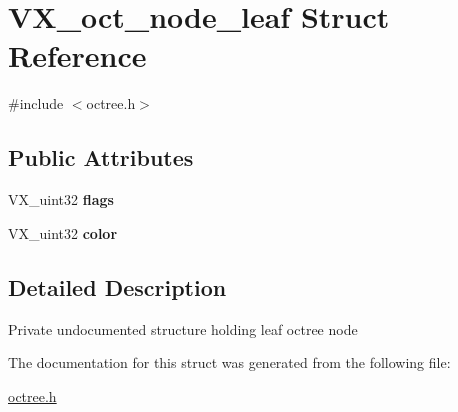 \hypertarget{structVX__oct__node__leaf}{\section{V\-X\-\_\-oct\-\_\-node\-\_\-leaf Struct Reference}
\label{structVX__oct__node__leaf}
}


{\ttfamily \#include $<$octree.\-h$>$}

\subsection*{Public Attributes}
\begin{DoxyCompactItemize}
\item 
\hypertarget{structVX__oct__node__leaf_ac5404d84a76c73f26029b6add33f9824}{V\-X\-\_\-uint32 {\bfseries flags}}\label{structVX__oct__node__leaf_ac5404d84a76c73f26029b6add33f9824}

\item 
\hypertarget{structVX__oct__node__leaf_added77d95343df9522a6d9fd60d2dc38}{V\-X\-\_\-uint32 {\bfseries color}}\label{structVX__oct__node__leaf_added77d95343df9522a6d9fd60d2dc38}

\end{DoxyCompactItemize}


\subsection{Detailed Description}
Private undocumented structure holding leaf octree node 

The documentation for this struct was generated from the following file\-:\begin{DoxyCompactItemize}
\item 
\hyperlink{octree_8h}{octree.\-h}\end{DoxyCompactItemize}
